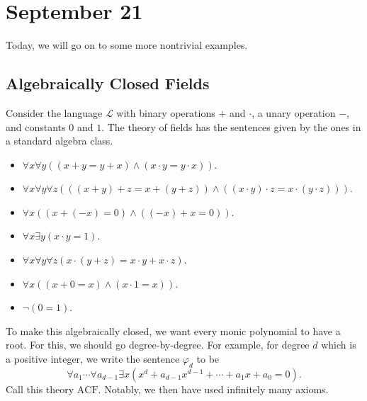 \documentclass[../notes.tex]{subfiles}
\begin{document}
\section{September 21}

Today, we will go on to some more nontrivial examples.

\subsection{Algebraically Closed Fields}
Consider the language $\mathcal L$ with binary operations $+$ and $\cdot$, a unary operation $-$, and constants $0$ and $1$. The theory of fields has the sentences given by the ones in a standard algebra class.
\begin{itemize}
	\item $\forall x\forall y((x+y=y+x)\land(x\cdot y=y\cdot x))$.
	\item $\forall x\forall y\forall z(((x+y)+z=x+(y+z))\land((x\cdot y)\cdot z=x\cdot(y\cdot z)))$.
	\item $\forall x((x+(-x)=0)\land((-x)+x=0))$.
	\item $\forall x\exists y(x\cdot y=1)$.
	\item $\forall x\forall y\forall z(x\cdot(y+z)=x\cdot y+x\cdot z)$.
	\item $\forall x((x+0=x)\land(x\cdot1=x))$.
	\item $\lnot(0=1)$.
\end{itemize}
To make this algebraically closed, we want every monic polynomial to have a root. For this, we should go degree-by-degree. For example, for degree $d$ which is a positive integer, we write the sentence $\varphi_d$ to be
\[\forall a_1\cdots\forall a_{d-1}\exists x\left(x^d+a_{d-1}x^{d-1}+\cdots+a_1x+a_0=0\right).\]
Call this theory $\mathrm{ACF}$. Notably, we then have used infinitely many axioms.
\end{document}
